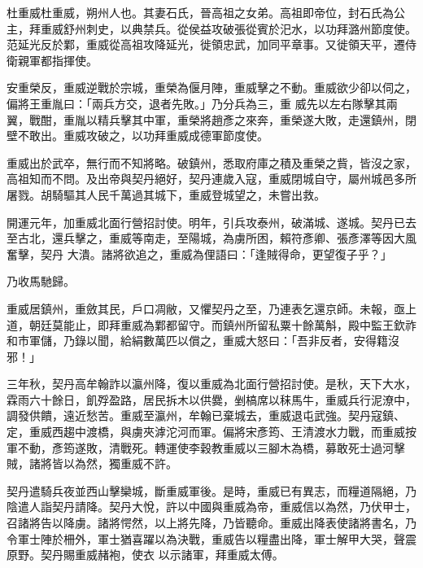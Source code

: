 
\begin{pinyinscope}

 杜重威杜重威，朔州人也。其妻石氏，晉高祖之女弟。高祖即帝位，封石氏為公主，拜重威舒州刺史，以典禁兵。從侯益攻破張從賓於汜水，以功拜潞州節度使。范延光反於鄴，重威從高祖攻降延光，徙領忠武，加同平章事。又徙領天平，遷侍衛親軍都指揮使。



 安重榮反，重威逆戰於宗城，重榮為偃月陣，重威擊之不動。重威欲少卻以伺之，偏將王重胤曰：「兩兵方交，退者先敗。」乃分兵為三，重
 威先以左右隊擊其兩翼，戰酣，重胤以精兵擊其中軍，重榮將趙彥之來奔，重榮遂大敗，走還鎮州，閉壁不敢出。重威攻破之，以功拜重威成德軍節度使。



 重威出於武卒，無行而不知將略。破鎮州，悉取府庫之積及重榮之貲，皆沒之家，高祖知而不問。及出帝與契丹絕好，契丹連歲入寇，重威閉城自守，屬州城邑多所屠戮。胡騎驅其人民千萬過其城下，重威登城望之，未嘗出救。



 開運元年，加重威北面行營招討使。明年，引兵攻泰州，破滿城、遂城。契丹已去至古北，還兵擊之，重威等南走，至陽城，為虜所困，賴符彥卿、張彥澤等因大風奮擊，契丹
 大潰。諸將欲追之，重威為俚語曰：「逢賊得命，更望復子乎？」



 乃收馬馳歸。



 重威居鎮州，重斂其民，戶口凋敝，又懼契丹之至，乃連表乞還京師。未報，亟上道，朝廷莫能止，即拜重威為鄴都留守。而鎮州所留私粟十餘萬斛，殿中監王欽祚和市軍儲，乃錄以聞，給絹數萬匹以償之，重威大怒曰：「吾非反者，安得籍沒邪！」



 三年秋，契丹高牟翰詐以瀛州降，復以重威為北面行營招討使。是秋，天下大水，霖雨六十餘日，飢殍盈路，居民拆木以供爨，剉槁席以秣馬牛，重威兵行泥潦中，調發供饋，遠近愁苦。重威至瀛州，牟翰已棄城去，重威退屯武強。契丹寇鎮、
 定，重威西趨中渡橋，與虜夾滹沱河而軍。偏將宋彥筠、王清渡水力戰，而重威按軍不動，彥筠遂敗，清戰死。轉運使李穀教重威以三腳木為橋，募敢死士過河擊賊，諸將皆以為然，獨重威不許。



 契丹遣騎兵夜並西山擊欒城，斷重威軍後。是時，重威已有異志，而糧道隔絕，乃陰遣人詣契丹請降。契丹大悅，許以中國與重威為帝，重威信以為然，乃伏甲士，召諸將告以降虜。諸將愕然，以上將先降，乃皆聽命。重威出降表使諸將書名，乃令軍士陣於柵外，軍士猶喜躍以為決戰，重威告以糧盡出降，軍士解甲大哭，聲震原野。契丹賜重威赭袍，使衣
 以示諸軍，拜重威太傅。




\end{pinyinscope}
